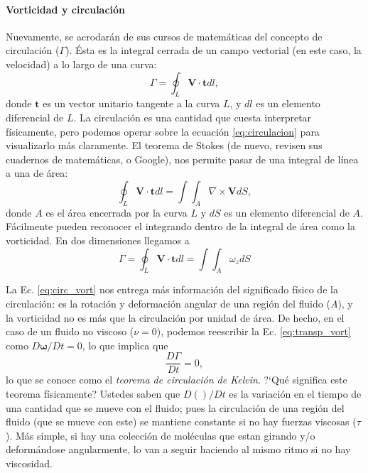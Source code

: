 \paragraph*{Vorticidad y circulación}
Nuevamente, se acrodarán de sus cursos de matemáticas del concepto de circulación ($\Gamma$).
Ésta es la integral cerrada de un campo vectorial (en este caso, la velocidad) a lo largo de una curva:
%
\begin{equation}\label{eq:circulacion}
\Gamma = \oint_L \mathbf{V}\cdot\mathbf{t}dl,
\end{equation}
%
donde $\mathbf{t}$ es un vector unitario tangente a la curva $L$, y $dl$ es un elemento diferencial de $L$.
La circulación es una cantidad que cuesta interpretar físicamente, pero podemos operar sobre la ecuación \eqref{eq:circulacion} para visualizarlo más claramente.
El teorema de Stokes (de nuevo, revisen sus cuadernos de matemáticas, o Google), nos permite pasar de una integral de línea a una de área:
%
\begin{equation}
\oint_L\mathbf{V}\cdot\mathbf{t}dl = \int\int_A\nabla\times\mathbf{V}dS,
\end{equation}
%
donde $A$ es el área encerrada por la curva $L$ y $dS$ es un elemento diferencial de $A$.
Fácilmente pueden reconocer el integrando dentro de la integral de área como la vorticidad. 
En dos dimensiones llegamos a
%
\begin{equation}\label{eq:circ_vort}
\Gamma = \oint_L\mathbf{V}\cdot\mathbf{t}dl = \int\int_A\omega_zdS
\end{equation}

La Ec. \eqref{eq:circ_vort} nos entrega más información del significado físico de la circulación: es la rotación y deformación angular de una región del fluido ($A$), y la vorticidad no es más que la circulación por unidad de área.
De hecho, en el caso de un fluido no viscoso ($\nu=0$), podemos reescribir la Ec. \eqref{eq:transp_vort} como $D\boldsymbol{\omega}/Dt=0$, lo que implica que
%
\begin{equation}\label{eq:teorema_kelvin}
\frac{D\Gamma}{Dt}=0,
\end{equation}
%
lo que se conoce como el \emph{teorema de circulación de Kelvin}.
\mbox{?`}Qué significa este teorema físicamente? Ustedes saben que $D()/Dt$ es la variación en el tiempo de una cantidad que se mueve con el fluido; pues la circulación de una región del fluido (que se mueve con este) se mantiene constante si no hay fuerzas viscosas ($\tau$).
Más simple, si hay una colección de moléculas que estan girando y/o deformándose angularmente, lo van a seguir haciendo al mismo ritmo si no hay viscosidad.  

